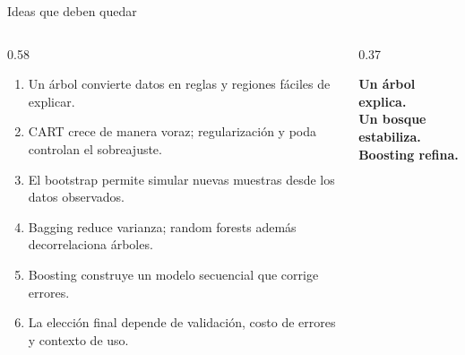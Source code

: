 \documentclass[aspectratio=169,11pt,table]{beamer}
\begin{document}
\begin{frame}{Ideas que deben quedar}
\begin{columns}[T,onlytextwidth]
\begin{column}{0.58\textwidth}
\begin{enumerate}
  \item Un árbol convierte datos en reglas y regiones fáciles de explicar.
  \item CART crece de manera voraz; regularización y poda controlan el sobreajuste.
  \item El bootstrap permite simular nuevas muestras desde los datos observados.
  \item Bagging reduce varianza; random forests además decorrelaciona árboles.
  \item Boosting construye un modelo secuencial que corrige errores.
  \item La elección final depende de validación, costo de errores y contexto de uso.
\end{enumerate}
\end{column}
\begin{column}{0.37\textwidth}
\begin{keybox}
\centering
\large
\textbf{Un árbol explica.}\\[0.18cm]
\textbf{Un bosque estabiliza.}\\[0.18cm]
\textbf{Boosting refina.}
\end{keybox}
\vspace{0.24cm}
\centering
{}\\[0.12cm]
\\[0.12cm]
\end{column}
\end{columns}
\end{frame}
\end{document}
